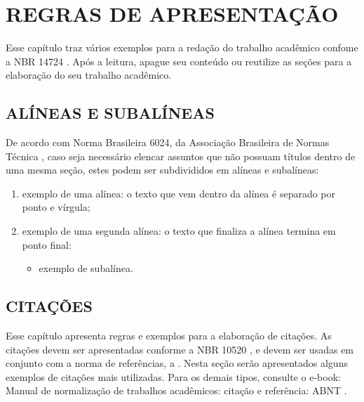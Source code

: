 \documentclass[
  12pt,		%
  a4paper,	%
  openright,  %
  oneside,	%
  chapter=TITLE,		%
  section=TITLE,		%
  english,	%
  french,	    %
  spanish,	%
  brazil	    %
]{abntex2}
\begin{document}
        
           
    \chapter{REGRAS DE APRESENTAÇÃO} 

        Esse capítulo traz vários exemplos para a redação do trabalho acadêmico confome a NBR 14724 \cite{NBR14724}. Após a leitura, apague seu conteúdo ou reutilize as seções para a elaboração do seu trabalho acadêmico.

    \section{ALÍNEAS E SUBALÍNEAS} 

        De acordo com Norma Brasileira 6024, da Associação Brasileira de Normas Técnica \cite{NBR6024}, caso seja necessário elencar assuntos que não possuam títulos dentro de uma mesma seção, estes podem ser subdivididos em alíneas e subalíneas:
        
    \begin{enumerate}[label=\alph*)]
        \item exemplo de uma alínea: o texto que vem dentro da alínea é separado por ponto e vírgula;
        \item exemplo de uma segunda alínea: o texto que finaliza a alínea termina em ponto final:
        \begin{itemize}
            \item[--] exemplo de subalínea.
        \end{itemize}
    \end{enumerate}       

     \section{CITAÇÕES}

        Esse capítulo apresenta regras e exemplos para a elaboração de citações. As citações devem ser apresentadas conforme a NBR 10520 \cite{NBR10520}, e devem ser usadas em conjunto com a norma de referências, a .
        Nesta seção serão apresentados alguns exemplos de citações mais utilizadas. Para os demais tipos, consulte o e-book: Manual de normalização de trabalhos acadêmicos: citação e referência: ABNT \cite{unesp2020ref}.
      
\end{document}

